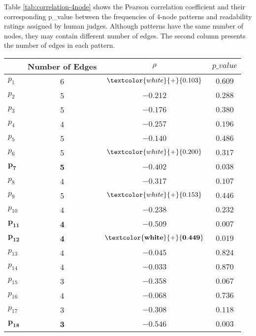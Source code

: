 Table \ref{tab:correlation-4node} shows the Pearson correlation coefficient and their corresponding p\_value between the frequencies of 4-node patterns and readability ratings assigned by human judges. 
Although patterns have the same number of nodes, they may contain different number of edges. 
The second column presents the number of edges in each pattern. 

\begin{table}[!ht]
	\begin{center}
		\begin{tabular}{lccc}
			\hline
   								& Number of Edges & $\rho$ 						 	& $p\_value$				\\
   			\hline
			$p_1$ 				& 6 			  & $\textcolor{white}{+}{0.103}$ 	& $0.609$					\\
			$p_2$ 				& 5 			  & $-0.212$ 					 	& $0.288$					\\
			$p_3$  				& 5				  & $-0.176$				     	& $0.380$					\\
			$p_4$  				& 4 			  & $-0.257$ 				     	& $0.196$					\\
			$p_5$ 				& 5 			  & $-0.140$ 					 	& $0.486$					\\
			$p_6$  				& 5 			  & $\textcolor{white}{+}{0.200}$  	& $0.317$					\\
			$\mathbf{p_7}$ 	& \textbf{5} 	  & $\mathbf{-0.402}$ 			 	& $\mathbf{0.038}$			\\
			$p_8$  				& 4 			  & $-0.317$ 					 	& $0.107$					\\
			$p_9$ 				& 5 			  & $\textcolor{white}{+}{0.153}$  	& $0.446$					\\
			$p_{10}$ 			& 4 			  & $-0.238$ 					 	& $0.232$					\\
			$\mathbf{p_{11}}$ 	& \textbf{4} 	  & $\mathbf{-0.509}$            	& $\mathbf{0.007}$			\\
			$\mathbf{p_{12}}$  	& \textbf{4} 	  & $\mathbf{\textcolor{white}{+}{0.449}}$ & $\mathbf{0.019}$	\\
			$p_{13}$			& 4 			  & $-0.045$ 						& $0.824$					\\
			$p_{14}$			& 4 			  & $-0.033$ 						& $0.870$					\\
			$p_{15}$			& 3				  & $-0.358$ 						& $0.067$					\\
			$p_{16}$ 			& 4 			  & $-0.068$ 						& $0.736$					\\
			$p_{17}$			& 3 			  & $-0.308$ 						& $0.118$					\\
			$\mathbf{p_{18}}$	& \textbf{3}	  & $\mathbf{-0.546}$				& $\mathbf{0.003}$			\\

\end{tabular}
\end{center}
\end{table}
